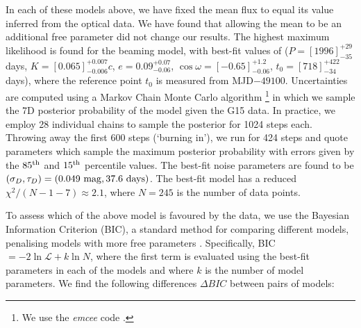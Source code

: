 In each of these models above, we have fixed the mean flux to equal
its value inferred from the optical data.  We have found that allowing
the mean to be an additional free parameter did not change our
results.  The highest maximum likelihood is found for the beaming
model, with best-fit values of
($P=\left[1996\right]^{+29}_{-35}$ days,
$K=\left[0.065\right]^{+0.007}_{-0.006} c$, 
$e ={0.09}^{+0.07}_{-0.06}$,
$\cos\omega=\left[-0.65\right]^{+1.2}_{-0.06}$, 
$t_0=\left[718\right]^{+422}_{-34}$ days), where the reference point
$t_0$ is measured from MJD$-49100$. 
Uncertainties are computed using a Markov Chain Monte Carlo algorithm \footnote{We use the \textit{emcee} code \cite{DFM:2013}.} in which we sample the 7D posterior probability of the model given the G15 data. In practice, we employ 28 individual chains to sample the posterior for 1024 steps each. Throwing away the first 600 steps (`burning in'), we run for 424 steps and quote parameters which sample the maximum posterior probability with errors given by the $85^{\rm th}$ and $15^{\rm th}$ percentile values.
%
%
The best-fit noise parameters are found to be $(\sigma_D,
\tau_D)=(0.049~{\rm mag}, 37.6~{\rm days})$.  The best-fit model has a
reduced $\chi^2/(N-1-7) \approx 2.1$, where $N=245$ is the number of
data points.

To assess which of the above model is favoured by the data, we use the
Bayesian Information Criterion (BIC), a standard method for comparing
different models, penalising models with more free
parameters \cite{KassRaftery1995}.  
 Specifically, BIC$=-2\ln\mathcal{L}
+ k \ln N$, where the first term is evaluated using the best-fit
parameters in each of the models and where $k$ is the number of model
parameters. We find the following differences $\Delta BIC$ between
pairs of models:

